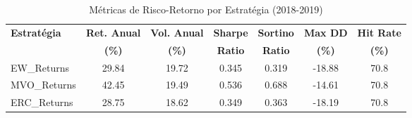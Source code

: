 
\begin{table}[H]
\centering
\caption{Métricas de Risco-Retorno por Estratégia (2018-2019)}
\label{tab:metricas_resumo}
\begin{tabular}{|l|c|c|c|c|c|c|}
\hline
\textbf{Estratégia} & \textbf{Ret. Anual} & \textbf{Vol. Anual} & \textbf{Sharpe} & \textbf{Sortino} & \textbf{Max DD} & \textbf{Hit Rate} \\
\textbf{} & \textbf{(\%)} & \textbf{(\%)} & \textbf{Ratio} & \textbf{Ratio} & \textbf{(\%)} & \textbf{(\%)} \\
\hline
EW_Returns & 29.84 & 19.72 & 0.345 & 0.319 & -18.88 & 70.8 \\
MVO_Returns & 42.45 & 19.49 & 0.536 & 0.688 & -14.61 & 70.8 \\
ERC_Returns & 28.75 & 18.62 & 0.349 & 0.363 & -18.19 & 70.8 \\
\hline
\end{tabular}
\end{table}
